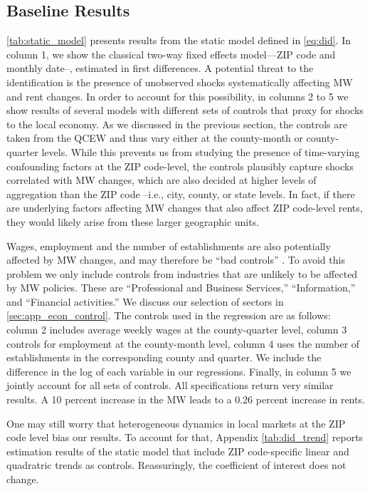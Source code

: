 \subsection{Baseline Results}\label{sec:baseline_results}

\autoref{tab:static_model} presents results from the static model defined in \autoref{eq:did}. 
In column 1, we show the classical two-way fixed effects model---ZIP code and monthly date--, 
estimated in first differences. A potential threat to the identification is the presence of 
unobserved shocks systematically affecting MW and rent changes. In order to account for this 
possibility, in columns 2 to 5 we show results of several models with different sets of 
controls that proxy for shocks to the local economy. As we discussed in the previous section, 
the controls are taken from the QCEW and thus vary either at the county-month or 
county-quarter levels. While this prevents us from studying the presence of time-varying 
confounding factors at the ZIP code-level, the controls plausibly capture shocks correlated 
with MW changes, which are also decided at higher levels of aggregation than the ZIP code 
--i.e., city, county, or state levels. In fact, if there are underlying factors affecting MW 
changes that also affect ZIP code-level rents, they would likely arise from these larger 
geographic units. 

Wages, employment and the number of establishments are also potentially affected by MW changes,
and may therefore be ``bad controls'' \parencite{AngristPischke2009}. To avoid this problem we 
only include controls from industries that are unlikely to be affected by MW policies. These 
are ``Professional and Business Services,'' ``Information,'' and ``Financial activities.'' We 
discuss our selection of sectors in \autoref{sec:app_econ_control}. The controls used in the 
regression are as follows: column 2 includes average weekly wages at the county-quarter level, 
column 3 controls for employment at the county-month level, column 4 uses the number of 
establishments in the corresponding county and quarter. We include the difference in the log of 
each variable in our regressions. Finally, in column 5 we jointly account for all sets of 
controls. All specifications return very similar results. A 10 percent increase in the MW leads 
to a 0.26 percent increase in rents. 

One may still worry that heterogeneous dynamics in local markets at the ZIP code level bias our 
results. To account for that, Appendix \autoref{tab:did_trend} reports estimation results of the 
static model that include ZIP code-specific linear and quadratric trends as controls. 
Reassuringly, the coefficient of interest does not change.


